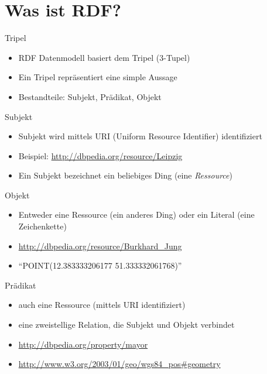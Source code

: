 \documentclass[14pt]{beamer}
\begin{document}

\section{Was ist RDF?}

\begin{frame}{Tripel}
\begin{itemize}
\item RDF Datenmodell basiert dem Tripel (3-Tupel)
\item Ein Tripel repräsentiert eine simple Aussage
\item Bestandteile: Subjekt, Prädikat, Objekt
\end{itemize}
\end{frame}

\begin{frame}{Subjekt}
\begin{itemize}
\item Subjekt wird mittels URI (Uniform Resource Identifier) identifiziert
\item Beispiel: \url{http://dbpedia.org/resource/Leipzig}
\item Ein Subjekt bezeichnet ein beliebiges Ding (eine \emph{Ressource})
\end{itemize}
\end{frame}

\begin{frame}{Objekt}
\begin{itemize}
\item Entweder eine Ressource (ein anderes Ding) oder ein Literal (eine Zeichenkette) 
\item \url{http://dbpedia.org/resource/Burkhard\_Jung}
\item \enquote{POINT(12.383333206177 51.333332061768)}
\end{itemize}
\end{frame}

\begin{frame}{Prädikat}
\begin{itemize}
\item auch eine Ressource (mittels URI identifiziert)
\item eine zweistellige Relation, die Subjekt und Objekt verbindet
\item \url{http://dbpedia.org/property/mayor}
\item \url{http://www.w3.org/2003/01/geo/wgs84\_pos#geometry} 
\end{itemize}
\end{frame}
\end{document}
